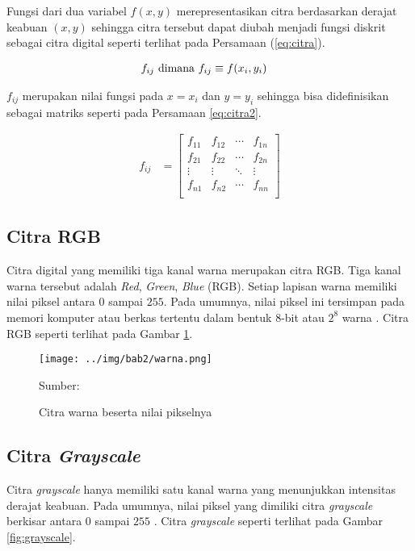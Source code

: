 Fungsi dari dua variabel $f(x,y)$ merepresentasikan citra berdasarkan derajat keabuan $(x,y)$ sehingga citra tersebut dapat diubah menjadi fungsi diskrit sebagai citra digital seperti terlihat pada Persamaan (\ref{eq:citra}).

\begin{align}
    f_{ij} \textnormal{ dimana } f_{ij} &\equiv f(x_i, y_i)
    \label{eq:citra}
\end{align}

$f_{ij}$ merupakan nilai fungsi pada $x=x_i$ dan $y=y_i$ sehingga bisa didefinisikan sebagai matriks seperti pada Persamaan \ref{eq:citra2}.

\begin{align}
    f_{ij} &=
    \begin{bmatrix}
        f_{11} &f_{12} &\cdots &f_{1n}\\
        f_{21} &f_{22} &\cdots &f_{2n}\\
        \vdots &\vdots &\ddots &\vdots\\
        f_{n1} &f_{n2} &\cdots &f_{nn}\\
    \end{bmatrix}
    \label{eq:citra2}
\end{align}

    \subsection{Citra RGB}
    Citra digital yang memiliki tiga kanal warna merupakan citra RGB. Tiga kanal warna tersebut adalah \textit{Red}, \textit{Green}, \textit{Blue} (RGB). Setiap lapisan warna memiliki nilai piksel antara $0$ sampai $255$. Pada umumnya, nilai piksel ini tersimpan pada memori komputer atau berkas tertentu dalam bentuk 8-bit atau $2^8$ warna \citep{Septiaji2018}. Citra RGB seperti terlihat pada Gambar \ref{fig:color}.

    \begin{figure}[H]
        \begin{center}
            \texttt{[image: ../img/bab2/warna.png]}
            \caption{Citra warna beserta nilai pikselnya}
            \label{fig:color}
            Sumber: \citep{Kusumanto2011}
        \end{center}
    \end{figure}

    \subsection{Citra \textit{Grayscale}}
    Citra \textit{grayscale} hanya memiliki satu kanal warna yang menunjukkan intensitas derajat keabuan. Pada umumnya, nilai piksel yang dimiliki citra \textit{grayscale} berkisar antara $0$ sampai $255$ \citep{Kusumanto2011}. Citra \textit{grayscale} seperti terlihat pada Gambar \ref{fig:grayscale}.

